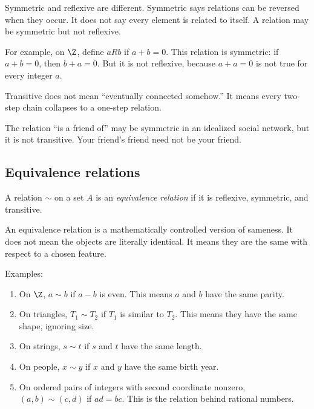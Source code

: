 \begin{trapbox}
Symmetric and reflexive are different. Symmetric says relations can be reversed when they occur. It does not say every element is related to itself. A relation may be symmetric but not reflexive.
\end{trapbox}

For example, on $\Z$, define $aRb$ if $a+b=0$. This relation is symmetric: if $a+b=0$, then $b+a=0$. But it is not reflexive, because $a+a=0$ is not true for every integer $a$.

\begin{trapbox}
Transitive does not mean ``eventually connected somehow.'' It means every two-step chain collapses to a one-step relation.
\end{trapbox}

The relation ``is a friend of'' may be symmetric in an idealized social network, but it is not transitive. Your friend's friend need not be your friend.

\subsection{Equivalence relations}

\begin{definition}
A relation $\sim$ on a set $A$ is an \emph{equivalence relation} if it is reflexive, symmetric, and transitive.
\end{definition}

An equivalence relation is a mathematically controlled version of sameness. It does not mean the objects are literally identical. It means they are the same with respect to a chosen feature.

Examples:

\begin{enumerate}
\item On $\Z$, $a\sim b$ if $a-b$ is even. This means $a$ and $b$ have the same parity.
\item On triangles, $T_1\sim T_2$ if $T_1$ is similar to $T_2$. This means they have the same shape, ignoring size.
\item On strings, $s\sim t$ if $s$ and $t$ have the same length.
\item On people, $x\sim y$ if $x$ and $y$ have the same birth year.
\item On ordered pairs of integers with second coordinate nonzero, $(a,b)\sim(c,d)$ if $ad=bc$. This is the relation behind rational numbers.
\end{enumerate}

